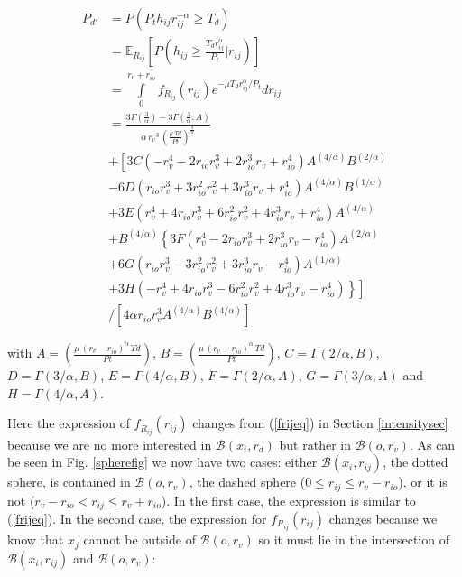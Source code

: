 \documentclass{sig-alternate-05-2015}
\begin{document}
\begin{align}
 \label{pdprimeq}
 P_{d'}&=P(P_t h_{ij} r_{ij}^{-\alpha}\geq T_d)\nonumber \\
 & = \mathbb{E}_{R_{ij}}\left[P\left(h_{ij} \geq \frac{T_dr_{ij}^{\alpha}}{P_t } | r_{ij} \right)\right]\nonumber \\
 & = \int \limits_{0}^{r_v + r_{io}} f_{R_{ij}}(r_{ij}) e^{-\mu T_d r_{ij}^{\alpha} / P_t} dr_{ij}\nonumber \\
 & = \frac{3 \Gamma\left( \frac{3}{\alpha}\right) - 3 \Gamma\left(\frac{3}{\alpha},A\right)}{\alpha\,{r_v}^{3}\,{\left( \frac{\mu\,Td}{Pt}\right) }^{\frac{3}{\alpha}}}\nonumber\\
 & + \left[3C(-r_v^4-2r_{io}r_v^3+2 r_{io}^3r_v+r_{io}^4)\right. A^{(4/\alpha)} B^{(2/\alpha)}\nonumber \\
 & -6D( r_{io}r_v^3+3r_{io}^2r_v^2+3r_{io}^3 r_v+r_{io}^4) A^{(4/\alpha)}B^{(1/\alpha)}\nonumber \\
 & +3E(r_v^4+4r_{io}r_v^3+6r_{io}^2r_v^2+4 r_{io}^3r_v+r_{io}^4) A^{(4/\alpha)}\nonumber \\
 & +B^{(4/\alpha)}\left\{3F(r_v^4-2r_{io}r_v^3+2r_{io}^3r_v-r_{io}^4)\right.A^{(2/\alpha)}\nonumber \\
 &+6G(r_{io}r_v^3-3r_{io}^2r_v^2+3 r_{io}^3r_v-r_{io}^4)A^{(1/\alpha)}\nonumber \\
 &\left. \left. +3H(- r_v^4+4r_{io}r_v^3-6r_{io}^2r_v^2+ 4r_{io}^3r_v-r_{io}^4)\right\}\right] \nonumber \\
 & / \left[4\alpha r_{io}r_v^3A^{(4/\alpha)} B^{(4/\alpha)}\right]
\end{align}

with
$A=\left(\frac{\mu\,{\left( r_v-r_{io}\right) }^{\alpha}\,Td}{Pt}\right)$,
$B=\left(\frac{\mu\,{\left( r_v+r_{io}\right) }^{\alpha}\,Td}{Pt}\right)$,
$C=\Gamma(2/\alpha,B)$,
$D=\Gamma(3/\alpha,B)$,
$E=\Gamma(4/\alpha,B)$,
$F=\Gamma(2/\alpha,A)$,
$G=\Gamma(3/\alpha,A)$ and
$H=\Gamma(4/\alpha,A)$.

Here the expression of $f_{R_{ij}}(r_{ij})$ changes from (\ref{frijeq}) in Section \ref{intensitysec} because we are no more interested in $\mathcal{B}(x_i,r_d)$ but rather in $\mathcal{B}(o,r_v)$. As can be seen in Fig. \ref{spherefig} we now have two cases: either $\mathcal{B}(x_i,r_{ij})$, the dotted sphere, is contained in $\mathcal{B}(o,r_v)$, the dashed sphere ($0\leq r_{ij} \leq r_v - r_{io}$), or it is not ($r_v - r_{io} < r_{ij} \leq r_v+r_{io}$). In the first case, the expression is similar to (\ref{frijeq}). In the second case, the expression for $f_{R_{ij}}(r_{ij})$ changes because we know that $x_j$ cannot be outside of $\mathcal{B}(o,r_v)$ so it must lie in the intersection of $\mathcal{B}(x_i,r_{ij})$ and $\mathcal{B}(o,r_v)$:
\end{document}
